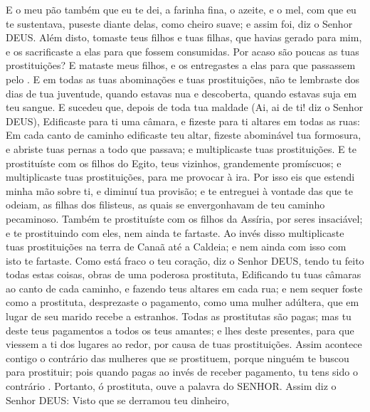 {  E o meu pão também que eu te dei, a farinha fina, o azeite, e o mel, com que eu te sustentava, puseste diante delas, como cheiro suave; e assim foi, diz o Senhor DEUS.
  Além disto, tomaste teus filhos e tuas filhas, que havias gerado para mim, e os sacrificaste a elas para que fossem consumidas. Por acaso são poucas as tuas prostituições?
  E mataste meus filhos, e os entregastes a elas para que passassem pelo
{} .
  E em todas as tuas abominações e tuas prostituições, não te lembraste dos dias de tua juventude, quando estavas nua e descoberta, quando estavas suja em teu sangue.
  E sucedeu que, depois de toda tua maldade (Ai, ai de ti! diz o Senhor DEUS),
  Edificaste para ti uma câmara,
 e fizeste para ti altares em todas as ruas:
  Em cada canto de caminho edificaste teu altar, fizeste abominável tua formosura, e abriste tuas pernas a todo que passava; e
{} multiplicaste tuas prostituições.
  E te prostituíste com os filhos do Egito, teus vizinhos, grandemente promíscuos;
 e multiplicaste tuas prostituições, para me provocar à ira.
  Por isso eis que estendi minha mão sobre ti, e diminuí tua provisão; e te entreguei à vontade das que te odeiam, as filhas dos filisteus, as quais se envergonhavam de teu caminho pecaminoso.
  Também te prostituíste com os filhos da Assíria, por seres insaciável; e te prostituindo com eles, nem ainda te fartaste.
  Ao invés disso multiplicaste tuas prostituições na terra de Canaã até a Caldeia; e nem ainda com isso com isto te fartaste.
  Como está fraco o teu coração, diz o Senhor DEUS, tendo tu feito todas estas coisas, obras de uma poderosa prostituta,
  Edificando tu tuas câmaras ao canto de cada caminho, e fazendo teus altares em cada rua; e nem sequer foste como a prostituta,
{} desprezaste o pagamento,
   como uma mulher adúltera, que em lugar de seu marido recebe a estranhos.
  Todas as prostitutas são pagas; mas tu deste teus pagamentos a todos os teus amantes; e lhes deste presentes, para que viessem a ti dos lugares ao redor, por causa de tuas prostituições.
  Assim acontece contigo o contrário das mulheres que se prostituem, porque ninguém te buscou para prostituir; pois quando pagas ao invés de receber pagamento, tu tens sido o contrário
{} .
  Portanto, ó prostituta, ouve a palavra do SENHOR.
  Assim diz o Senhor DEUS: Visto que se derramou teu dinheiro,
}
